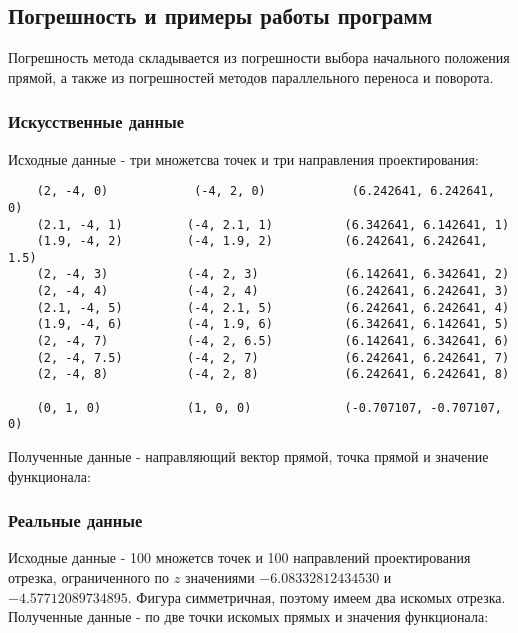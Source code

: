\subsection{Погрешность и примеры работы программ}\label{math3:error}

Погрешность метода складывается из погрешности выбора начального положения прямой, а также из погрешностей методов параллельного переноса и поворота.

\newpage
\subsubsection{Искусственные данные}\label{math2:error:synth}

Исходные данные - три множетсва точек и три направления проектирования:

\begin{verbatim}
	(2, -4, 0)	          (-4, 2, 0)            (6.242641, 6.242641, 0)
	(2.1, -4, 1)         (-4, 2.1, 1)          (6.342641, 6.142641, 1)
	(1.9, -4, 2)         (-4, 1.9, 2)          (6.242641, 6.242641, 1.5)
	(2, -4, 3)           (-4, 2, 3)            (6.142641, 6.342641, 2)
	(2, -4, 4)           (-4, 2, 4)            (6.242641, 6.242641, 3)
	(2.1, -4, 5)         (-4, 2.1, 5)          (6.242641, 6.242641, 4)
	(1.9, -4, 6)         (-4, 1.9, 6)          (6.342641, 6.142641, 5)
	(2, -4, 7)           (-4, 2, 6.5)          (6.142641, 6.342641, 6)
	(2, -4, 7.5)         (-4, 2, 7)            (6.242641, 6.242641, 7)
	(2, -4, 8)           (-4, 2, 8)            (6.242641, 6.242641, 8)

	(0, 1, 0)            (1, 0, 0)             (-0.707107, -0.707107, 0)
\end{verbatim}

Полученные данные - направляющий вектор прямой, точка прямой и значение функционала:

\subsubsection{Реальные данные}\label{math2:error:real}

Исходные данные - 100 множетсв точек и 100 направлений проектирования отрезка, ограниченного по $z$ значениями $-6.08332812434530$ и $-4.57712089734895$. Фигура симметричная, поэтому имеем два искомых отрезка.\\

Полученные данные - по две точки искомых прямых и значения функционала:

\newpage


